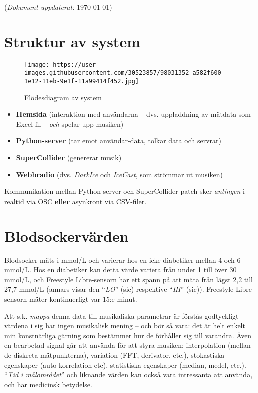 (\emph{Dokument uppdaterat:} \today)

\hypertarget{struktur-av-system}{%
\section{Struktur av system}\label{struktur-av-system}}

\begin{figure}
\centering
\texttt{[image: https://user-images.githubusercontent.com/30523857/98031352-a582f600-1e12-11eb-9e1f-11a99414f452.jpg]}
\caption{Flödesdiagram av system}
\end{figure}

\begin{itemize}
\tightlist
\item
  \textbf{Hemsida} (interaktion med användarna -- dvs. uppladdning av
  mätdata som Excel-fil -- \emph{och} spelar upp musiken)
\item
  \textbf{Python-server} (tar emot användar-data, tolkar data och
  servrar)
\item
  \textbf{SuperCollider} (genererar musik)
\item
  \textbf{Webbradio} (dvs. \emph{DarkIce} och \emph{IceCast}, som
  strömmar ut musiken)
\end{itemize}

Kommunikation mellan Python-server och SuperCollider-patch sker
\emph{antingen} i realtid via OSC \textbf{eller} asynkront via
CSV-filer.

\hypertarget{blodsockervuxe4rden}{%
\section{Blodsockervärden}\label{blodsockervuxe4rden}}

Blodsocker mäts i mmol/L och varierar hos en icke-diabetiker mellan 4
och 6 mmol/L. Hos en diabetiker kan detta värde variera från under 1
till över 30 mmol/L, och Freestyle Libre-sensorn har ett spann på att
mäta från lägst 2,2 till 27,7 mmol/L (annars visar den ``\emph{LO}''
(sic) respektive ``\emph{HI}'' (sic)). Freestyle Libre-sensorn mäter
kontinuerligt var 15:e minut.

Att s.k. \emph{mappa} denna data till musikaliska parametrar är förstås
godtyckligt -- värdena i sig har ingen musikalisk mening -- och bör så
vara: det är helt enkelt min konstnärliga gärning som bestämmer hur de
förhåller sig till varandra. Även en bearbetad signal går att använda
för att styra musiken: interpolation (mellan de diskreta mätpunkterna),
variation (FFT, derivator, etc.), stokastiska egenskaper
(auto-korrelation etc), statistiska egenskaper (median, medel, etc.).
``\emph{Tid i målområdet}'' och liknande värden kan också vara
intressanta att använda, och har medicinsk betydelse.


